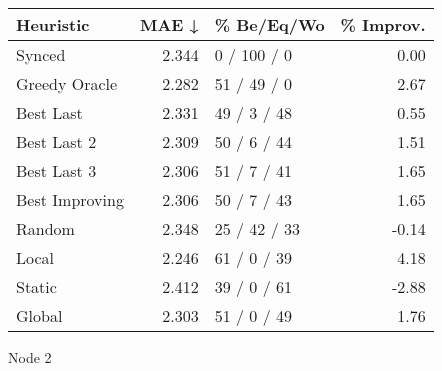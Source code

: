 \begin{tabular}{lrlr}
\toprule
\textbf{Heuristic} & \textbf{MAE ↓} & \textbf{\% Be/Eq/Wo} & \textbf{\% Improv.} \\
\midrule
            Synced &          2.344 &          0 / 100 / 0 &                0.00 \\
     Greedy Oracle &          2.282 &          51 / 49 / 0 &                2.67 \\
         Best Last &          2.331 &          49 / 3 / 48 &                0.55 \\
       Best Last 2 &          2.309 &          50 / 6 / 44 &                1.51 \\
       Best Last 3 &          2.306 &          51 / 7 / 41 &                1.65 \\
    Best Improving &          2.306 &          50 / 7 / 43 &                1.65 \\
            Random &          2.348 &         25 / 42 / 33 &               -0.14 \\
             Local &          2.246 &          61 / 0 / 39 &                4.18 \\
            Static &          2.412 &          39 / 0 / 61 &               -2.88 \\
            Global &          2.303 &          51 / 0 / 49 &                1.76 \\
\bottomrule
\end{tabular}
\caption{Node 2}
\label{tab:ds_non_lr05_le1_bs4_2}
